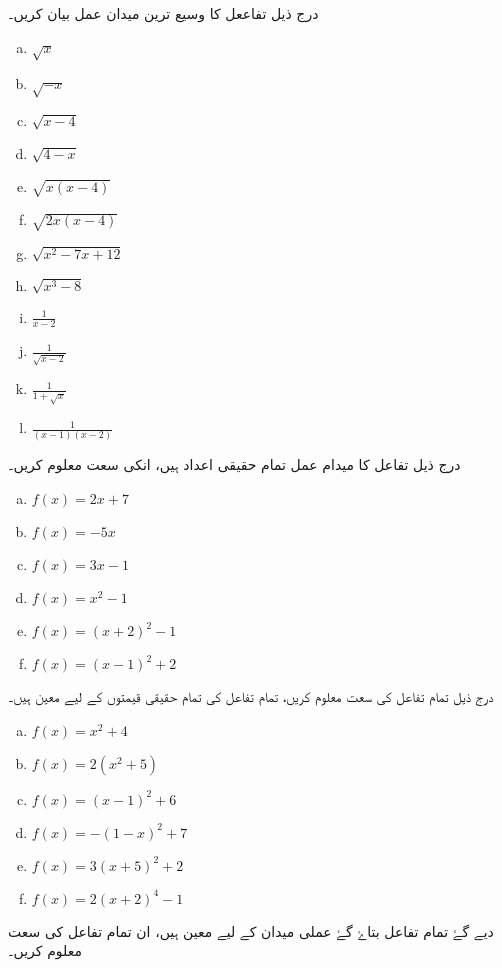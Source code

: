 درج ذیل تفاععل کا وسیع ترین میدان عمل بیان کریں۔
\begin{multicols}{4}
\begin{enumerate}[a.]
\item \( \sqrt{x} \)
\item \( \sqrt{-x} \)
\item \(\sqrt{x-4}  \)
\item \( \sqrt{4-x} \)
\item \( \sqrt{x(x-4)} \)
\item \( \sqrt{2x(x-4)} \)
\item \( \sqrt{x^{2}-7x+12} \)
\item \( \sqrt{x^{3}-8}\) 
\item \(\frac{1}{x-2}  \)
\item \( \frac{1}{\sqrt{x-2}} \)
\item \(\frac{1}{1+\sqrt{x}}  \)
\item \( \frac{1}{(x-1)(x-2)} \)
\end{enumerate}
\end{multicols}
 درج ذیل تفاعل کا میدام عمل تمام حقیقی اعداد ہیں، انکی سعت معلوم کریں۔
\begin{multicols}{3}
\begin{enumerate}[a.]
\item \( f(x)=2x+7 \)
\item \( f(x)=-5x \)
\item \(f(x)=3x-1  \)
\item \( f(x)=x^{2}-1 \)
\item \( f(x)=(x+2)^{2}-1 \)
\item \( f(x)=(x-1)^{2}+2 \)
\end{enumerate}
\end{multicols}
درج ذیل تمام تفاعل کی سعت معلوم کریں، تمام تفاعل کی تمام حقیقی قیمتوں کے لیے معین ہیں۔
 \begin{multicols}{2}
\begin{enumerate}[a.]
\item \(  f(x)=x^{2}+4\)
\item \( f(x)=2(x^{2}+5) \)
\item \( f(x)=(x-1)^{2}+6 \)
\item \( f(x)=-(1-x)^{2}+7 \)
\item \(f(x)=3(x+5)^{2}+2  \)
\item \( f(x)=2(x+2)^{4}-1 \)
\end{enumerate}
\end{multicols}
دیے گۓ تمام تفاعل بتاۓ گۓ عملی میدان کے لیے معین ہیں، ان تمام تفاعل کی سعت معلوم کریں۔

